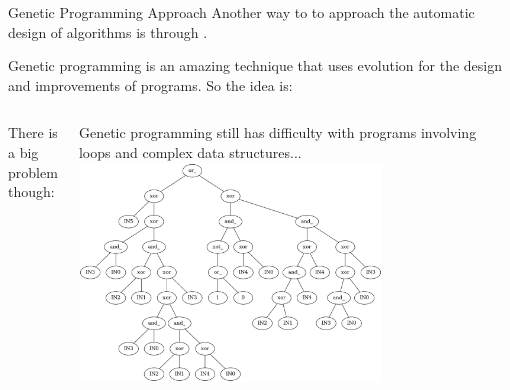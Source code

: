 \documentclass[aspectratio=169]{beamer}
\begin{document}
\begin{frame}{Genetic Programming Approach}
  Another way to to approach the automatic design of algorithms is
  through .\bigskip

  Genetic programming is an amazing technique that uses evolution for
  the design and improvements of programs. So the idea is:\\
  \bigskip

  \begin{columns}
    There is a big problem though:\medskip

    Genetic programming still has difficulty with programs involving
    loops and complex data structures... 
    \includegraphics[width=0.7\textwidth]{img/GP_tree_big.png}
  \end{columns}
\end{frame}
\end{document}

